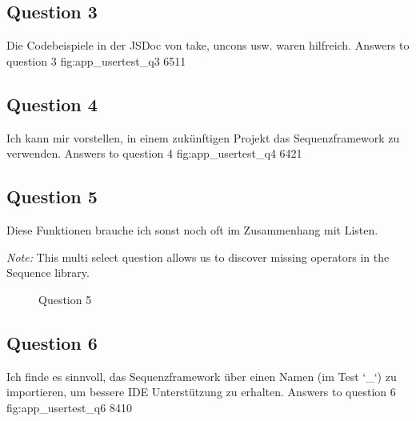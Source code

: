 \subsection*{Question 3}
\label{sub:ut_q3}
Die Codebeispiele in der JSDoc von take, uncons usw. waren hilfreich. 
\likertbarchart
  {Answers to question 3}
  {fig:app_usertest_q3}
  {6}{5}{1}{1}

\subsection*{Question 4}
\label{sub:ut_q4}
Ich kann mir vorstellen, in einem zukünftigen Projekt das Sequenzframework zu verwenden.
\likertbarchart
  {Answers to question 4}
  {fig:app_usertest_q4}
  {6}{4}{2}{1}

\subsection*{Question 5}
\label{sub:ut_q5}
Diese Funktionen brauche ich sonst noch oft im Zusammenhang mit Listen.

\textit{Note:} This multi select question allows us to discover missing
operators in the Sequence library.
  \begin{figure}[H]
    \centering
    \caption{Question 5}
    \label{fig:app_usertest_q5}
  \end{figure}
\subsection*{Question 6}
\label{sub:ut_q6}
Ich finde es sinnvoll, das Sequenzframework über einen Namen (im Test `\_`) zu importieren, um bessere IDE Unterstützung zu erhalten.
\likertbarchart
  {Answers to question 6}
  {fig:app_usertest_q6}
  {8}{4}{1}{0}

